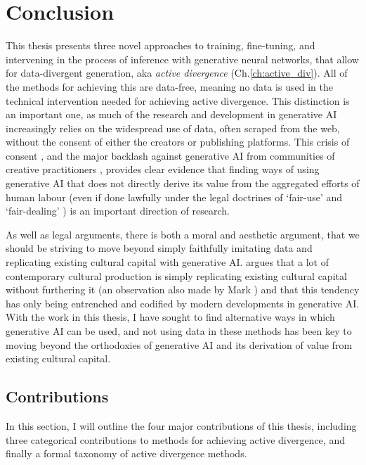 \chapter{Conclusion}
\label{ch:conclusion}

This thesis presents three novel approaches to training, fine-tuning, and intervening in the process of inference with generative neural networks, that allow for data-divergent generation, aka \textit{active divergence} (Ch.\ref{ch:active_div}).
All of the methods for achieving this are data-free, meaning no data is used in the technical intervention needed for achieving active divergence.
This distinction is an important one, as much of the research and development in generative AI increasingly relies on the widespread use of data, often scraped from the web, without the consent of either the creators or publishing platforms.
This crisis of consent \citep{longpre2024consent}, and the major backlash against generative AI from communities of creative practitioners \citep{whiddington2022backlash}, provides clear evidence that finding ways of using generative AI that does not directly derive its value from the aggregated efforts of human labour (even if done lawfully under the legal doctrines of `fair-use' \citep{sobel2017artificial,alhadeff2024limits} and `fair-dealing' \citep{guadamuz2023scanner}) is an important direction of research.

As well as legal arguments, there is both a moral and aesthetic argument, that we should be striving to move beyond simply faithfully imitating data and replicating existing cultural capital with generative AI. 
\cite{rafferty2016future} argues that a lot of contemporary cultural production is simply replicating existing cultural capital without furthering it (an observation also made by Mark \cite{fisher2009capitalist}) and that this tendency has only being entrenched and codified by modern developments in generative AI.
With the work in this thesis, I have sought to find alternative ways in which generative AI can be used, and not using data in these methods has been key to moving beyond the orthodoxies of generative AI and its derivation of value from existing cultural capital.

\section{Contributions}

In this section, I will outline the four major contributions of this thesis, including three categorical contributions to methods for achieving active divergence, and finally a formal taxonomy of active divergence methods.

